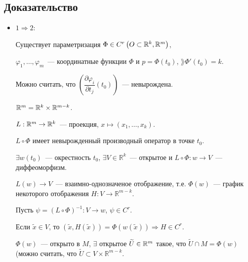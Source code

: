 \documentclass{article}
\begin{document}
            \subsection{Доказательство}
            
                \begin{itemize}
                
                    \item $1 \Rightarrow 2$:
                    
                        Существует параметризация $\Phi \in C^r \left( O \subset \mathbb{R}^k, \mathbb{R}^m \right)$,
                        
                        $\varphi_1, \ldots, \varphi_m$~--- координатные функции $\Phi$ и $p = \Phi(t_0)$, $\rang \Phi'(t_0) = k$.
                        
                        Можно считать, что $\left( \dfrac{\partial \varphi_i}{\partial t_j} (t_0) \right)$~--- невырождена.
                        
                        $\mathbb{R}^m = \mathbb{R}^k \times \mathbb{R}^{m - k}$.
                        
                        $L : \mathbb{R}^m \rightarrow \mathbb{R}^k$~--- проекция, $x \mapsto (x_1, \ldots, x_k)$.
                        
                        $L \circ \Phi$ имеет невырожденный производный оператор в точке $t_0$.
                        
                        $\exists w(t_0)$~--- окрестность $t_0$, $\exists V \in \mathbb{R}^k$~--- открытое и $L \circ \Phi : w \rightarrow V$~--- диффеоморфизм.
                        
                        $L(w) \rightarrow V$~--- взаимно-однозначеное отображение, т.е. $\Phi(w)$~--- график некоторого отображения $H : V \rightarrow \mathbb{R}^{m - k}$.
                        
                        Пусть $\psi = \left( L \circ \Phi \right)^{-1} : V \rightarrow w$, $\psi \in C^r$.
                        
                        Если $\widetilde{x} \in V$, то $\left( \widetilde{x}, H(\widetilde{x}) \right) = \Phi (w(\widetilde{x})) \Rightarrow H \in C^r$.
                        
                        $\Phi(w)$~--- открыто в $M$, $\exists$ открытое $\widetilde{U} \in \mathbb{R}^m$ такое, что $\widetilde{U} \cap M = \Phi(w)$ (можно считать, что $\widetilde{U} \subset V \times \mathbb{R}^{m - k}$.
                        

\end{itemize}
\end{document}
